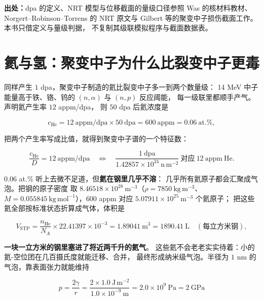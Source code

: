 {\footnotesize
\textbf{出处：}dpa 的定义、NRT 模型与位移截面的量级口径参照
Was 的核材料教材、Norgert--Robinson--Torrens 的 NRT 原文与
Gilbert 等的聚变中子损伤截面工作。
本书只借定义与量级判据，
不复制其级联模拟程序与截面数据表。
}

\section{氦与氢：聚变中子为什么比裂变中子更毒}
\label{sec:app-ay-he}

同样产生 $1$ dpa，聚变中子制造的氦比裂变中子多一到两个数量级：
14 MeV 中子能量高于铁、铬、钨的 $(n,\alpha)$ 与 $(n,p)$ 反应阈能，
每一级联里都顺手产气。声明氦产生率 $12$ appm/dpa，
则 $50$ dpa 后氦浓度是

\begin{equation}
c_\mathrm{He}=12\ \mathrm{appm/dpa}\times50\ \mathrm{dpa}
=600\ \mathrm{appm}=0.06\ \mathrm{at.\%},
\label{eq:app-ay-he}
\end{equation}

把两个产生率写成比值，就得到聚变中子谱的一个特征数：

\begin{equation}
\frac{c_\mathrm{He}}{D}=12\ \mathrm{appm/dpa}
\quad\Longleftrightarrow\quad
\frac{1\ \mathrm{dpa}}{1.42857\times10^{24}\ \mathrm{n\,m^{-2}}}
\ \text{对应}\ 12\ \mathrm{appm}\ \mathrm{He}.
\label{eq:app-ay-ratio}
\end{equation}

$0.06$ at.\% 听上去微不足道，但\textbf{氦在钢里几乎不溶}：
几乎所有氦原子都会汇聚成气泡。把钢的原子密度
取 $8.46518\times10^{28}\ \mathrm{m^{-3}}$（$\rho=7850\ \mathrm{kg\,m^{-3}}$、
$M=0.055845\ \mathrm{kg\,mol^{-1}}$），$600$ appm 对应
$5.07911\times10^{25}\ \mathrm{m^{-3}}$ 个氦原子；
把这些氦全部按标准状态折算成气体，体积是

\begin{equation}
V_\mathrm{STP}=\frac{n_\mathrm{He}}{N_A}\times22.41397\times10^{-3}
=1.89041\ \mathrm{m^3}=1890.41\ \mathrm{L}
\quad(\text{每立方米钢}),
\label{eq:app-ay-stp}
\end{equation}

\textbf{一块一立方米的钢里塞进了将近两千升的氦气}。
这些氦不会老老实实待着：小的氦-空位团在几百摄氏度就能迁移、合并，
最终形成纳米级气泡。半径为 $1$ nm 的气泡，靠表面张力就能维持

\begin{equation}
p=\frac{2\gamma}{r}=\frac{2\times1.0\ \mathrm{J\,m^{-2}}}{1.0\times10^{-9}\ \mathrm{m}}
=2.0\times10^{9}\ \mathrm{Pa}=2\ \mathrm{GPa}
\label{eq:app-ay-bubble}
\end{equation}


